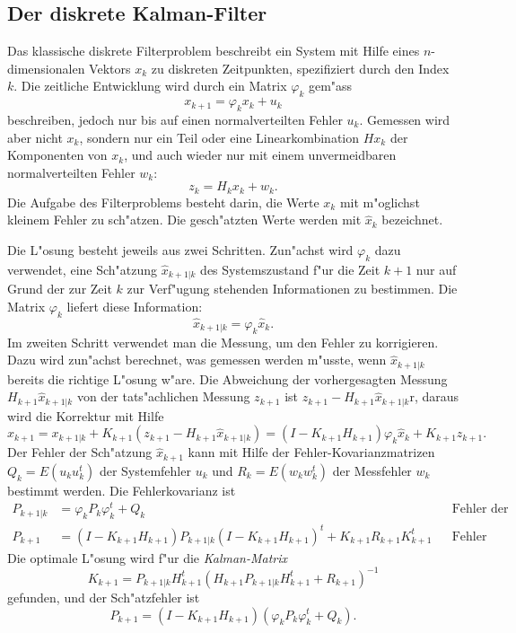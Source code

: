 \subsection{Der diskrete Kalman-Filter\label{skript:diskreter-kalman-filter}}
Das klassische diskrete Filterproblem beschreibt ein System mit Hilfe
eines $n$-dimensionalen Vektors $x_k$ zu diskreten Zeitpunkten, spezifiziert
durch den Index $k$.
Die zeitliche Entwicklung wird durch ein Matrix $\varphi_k$
gem"ass
\begin{equation}
x_{k+1} = \varphi_k x_k + u_k
\label{stochastisch:diskrete-entwicklungs-gleichung}
\end{equation}
beschreiben, jedoch nur bis auf einen normalverteilten Fehler $u_k$.
Gemessen wird aber nicht $x_k$, sondern nur ein Teil oder eine
Linearkombination $Hx_k$ der Komponenten von $x_k$, und auch wieder
nur mit einem unvermeidbaren normalverteilten Fehler $w_k$:
\[
z_k=H_kx_k + w_k.
\]
Die Aufgabe des Filterproblems besteht darin, die Werte $x_k$ mit m"oglichst
kleinem Fehler zu sch"atzen.
Die gesch"atzten Werte werden mit $\hat x_k$ bezeichnet.

Die L"osung besteht jeweils aus zwei Schritten. 
Zun"achst wird $\varphi_k$ dazu verwendet, eine Sch"atzung $\hat x_{k+1|k}$
des Systemszustand f"ur die Zeit $k+1$ nur auf Grund der zur Zeit
$k$ zur Verf"ugung stehenden Informationen zu bestimmen.
Die Matrix $\varphi_k$ liefert diese Information:
\[
\hat x_{k+1|k} = \varphi_k \hat x_k.
\]
Im zweiten Schritt verwendet man die Messung, um den Fehler zu korrigieren.
Dazu wird zun"achst berechnet, was gemessen werden m"usste, wenn
$\hat x_{k+1|k}$ bereits die richtige L"osung w"are.
Die Abweichung der vorhergesagten Messung $H_{k+1}\hat x_{k+1|k}$
von der tats"achlichen Messung $z_{k+1}$ ist
$z_{k+1}-H_{k+1}\hat x_{k+1|k}$r, daraus wird die Korrektur mit Hilfe
\[
\hat x_{k+1}
=
x_{k+1|k} + K_{k+1}(z_{k+1} - H_{k+1} \hat x_{k+1|k})
=
(I-K_{k+1}H_{k+1}) \varphi_{k}\hat x_k + K_{k+1}z_{k+1}.
\]
Der Fehler der Sch"atzung $\hat x_{k+1}$ kann mit Hilfe der
Fehler-Kovarianzmatrizen $Q_k=E(u_ku^t_k)$ der Systemfehler $u_k$
und $R_k=E(w_kw_k^t)$ der Messfehler $w_k$ bestimmt werden.
Die Fehlerkovarianz ist
\begin{align*}
P_{k+1|k}
&=
\varphi_k P_k \varphi_k^t + Q_k
&
&\text{Fehler der Vorhersage}
\\
P_{k+1}
&=
(I-K_{k+1}H_{k+1})P_{k+1|k}(I-K_{k+1}H_{k+1})^t + K_{k+1}R_{k+1}K_{k+1}^t
&
&\text{Fehler nach Korrektur}
\end{align*}
Die optimale L"osung wird f"ur die {\em Kalman-Matrix}
\[
K_{k+1}
=
P_{k+1|k}H_{k+1}^t(H_{k+1}P_{k+1|k}H_{k+1}^t + R_{k+1})^{-1}
\]
gefunden, und der Sch"atzfehler ist
\[
P_{k+1}=(I-K_{k+1}H_{k+1})(\varphi_{k}P_k\varphi_k^t+Q_k).
\]

